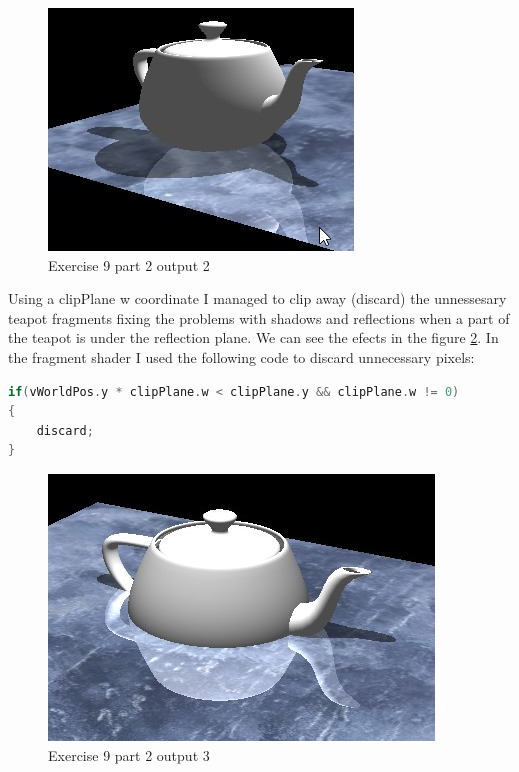 \clearpage
\begin{figure}[ht!]
	\begin{center}
		\includegraphics[width=.5\textwidth]{figures/exercise_9_part_2_2}
	\end{center}
	\vspace{-4.5ex}\caption{Exercise 9 part 2 output 2}
	\label{fig:exercise_9_part_2_2} 
\end{figure}

Using a clipPlane w coordinate I managed to clip away (discard) the unnessesary 
teapot fragments fixing the problems with shadows and reflections when a part of
the teapot is under the reflection plane. We can see the efects in the figure
\ref{fig:exercise_9_part_2_3}. In the fragment shader I used the following code
to discard unnecessary pixels: \\
\begin{lstlisting}[language=cpp, caption={clip plane - discard pixels}]
if(vWorldPos.y * clipPlane.w < clipPlane.y && clipPlane.w != 0)
{
	discard;
}
\end{lstlisting}
\begin{figure}[ht!]
	\begin{center}
		\includegraphics[width=.6\textwidth]{figures/exercise_9_part_2_3}
	\end{center}
	\vspace{-4.5ex}\caption{Exercise 9 part 2 output 3}
	\label{fig:exercise_9_part_2_3} 
\end{figure}
